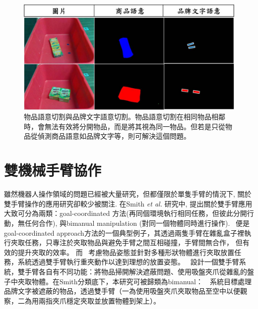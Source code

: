 \begin{figure}[H]
	\centering
	\includegraphics[height=!, width=1.0\linewidth, keepaspectratio=true]
	{./figures/product_vs_bn.jpg}
  \caption{物品語意切割與品牌文字語意切割。物品語意切割在相同物品相鄰時，會無法有效將分開物品，而是將其視為同一物品。但若是只從物品從偵測商品語意如品牌文字等，則可解決這個問題。}
  \label{figure:product_vs_bn}
\end{figure}

\section{雙機械手臂協作}
雖然機器人操作領域的問題已經被大量研究，但都僅限於單隻手臂的情況下, 關於雙手臂操作的應用研究卻較少被關注. 在Smith \textit{et al.} \cite{smith2012dual}研究中,
提出關於雙手臂應用大致可分為兩類：goal-coordinated 方法(再同個環境執行相同任務，但彼此分開行動，無任何合作), 與bimanual manipulation (對同一個物體同時進行操作).
~\cite{schwarz2018fast}便是goal-coordinated approach方法的一個典型例子，其透過兩隻手臂在雜亂盒子裡執行夾取任務，只專注於夾取物品與避免手臂之間互相碰撞，手臂間無合作，
但有效的提升夾取的效率。 而~\cite{harada2012pick} 考慮物品姿態並針對多種形狀物體進行夾取放置任務，系統透過雙手臂執行重夾動作以達到理想的放置姿態。
~\cite{miyazaki2017object}設計一個雙手臂系統，雙手臂各自有不同功能：將物品掃開解決遮蔽問題、使用吸盤夾爪從雜亂的盤子中夾取物體。在Smith分類底下，本研究可被歸類為bimanual：　系統目標處理品牌文字被遮蔽的物品，透過雙手臂（一為使用吸盤夾爪夾取物品至空中以便觀察，二為用兩指夾爪穩定夾取並放置物體到架上）。

